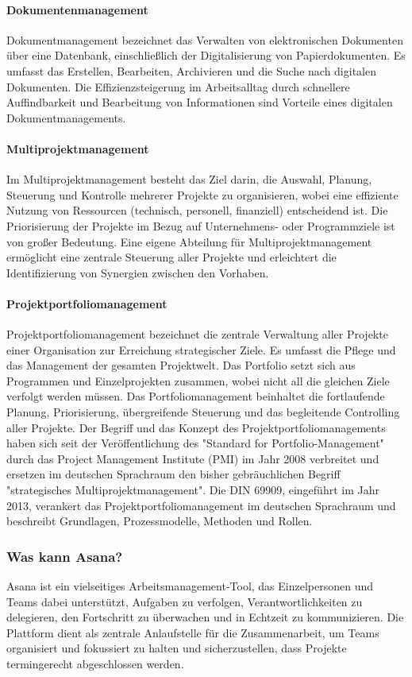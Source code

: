 \documentclass[sigconf, nonacm]{acmart}
\begin{document}
\paragraph{Dokumentenmanagement}
Dokumentmanagement bezeichnet das Verwalten von elektronischen Dokumenten über eine Datenbank, einschließlich der Digitalisierung von Papierdokumenten. Es umfasst das Erstellen, Bearbeiten, Archivieren und die Suche nach digitalen Dokumenten. Die Effizienzsteigerung im Arbeitsalltag durch schnellere Auffindbarkeit und Bearbeitung von Informationen sind Vorteile eines digitalen Dokumentmanagements.~\cite{schmuck_dokumentenmanagement_2019}
\paragraph{Multiprojektmanagement}
Im Multiprojektmanagement besteht das Ziel darin, die Auswahl, Planung, Steuerung und Kontrolle mehrerer Projekte zu organisieren, wobei eine effiziente Nutzung von Ressourcen (technisch, personell, finanziell) entscheidend ist. Die Priorisierung der Projekte im Bezug auf Unternehmens- oder Programmziele ist von großer Bedeutung. Eine eigene Abteilung für Multiprojektmanagement ermöglicht eine zentrale Steuerung aller Projekte und erleichtert die Identifizierung von Synergien zwischen den Vorhaben.~\cite{venzmer_multiprojektmanagement-software_2020}
\paragraph{Projektportfoliomanagement }
Projektportfoliomanagement bezeichnet die zentrale Verwaltung aller Projekte einer Organisation zur Erreichung strategischer Ziele. Es umfasst die Pflege und das Management der gesamten Projektwelt. Das Portfolio setzt sich aus Programmen und Einzelprojekten zusammen, wobei nicht all die gleichen Ziele verfolgt werden müssen. Das Portfoliomanagement beinhaltet die fortlaufende Planung, Priorisierung, übergreifende Steuerung und das begleitende Controlling aller Projekte. Der Begriff und das Konzept des Projektportfoliomanagements haben sich seit der Veröffentlichung des "Standard for Portfolio-Management" durch das Project Management Institute (PMI) im Jahr 2008 verbreitet und ersetzen im deutschen Sprachraum den bisher gebräuchlichen Begriff "strategisches Multiprojektmanagement". Die DIN 69909, eingeführt im Jahr 2013, verankert das Projektportfoliomanagement im deutschen Sprachraum und beschreibt Grundlagen, Prozessmodelle, Methoden und Rollen.~\cite{gmbh_detailseite_nodate}
\subsubsection{Was kann Asana?}
Asana ist ein vielseitiges Arbeitsmanagement-Tool, das Einzelpersonen und Teams dabei unterstützt, Aufgaben zu verfolgen, Verantwortlichkeiten zu delegieren, den Fortschritt zu überwachen und in Echtzeit zu kommunizieren. Die Plattform dient als zentrale Anlaufstelle für die Zusammenarbeit, um Teams organisiert und fokussiert zu halten und sicherzustellen, dass Projekte termingerecht abgeschlossen werden.
\\
\end{document}
